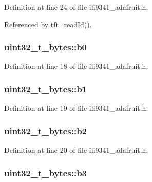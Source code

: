 Definition at line 24 of file ili9341\-\_\-adafruit.\-h.



Referenced by tft\-\_\-read\-Id().

\hypertarget{unionuint32__t__bytes_a92b86537decb69327191d870f41c60f7}{
\subsubsection[{b0}]{ uint32\-\_\-t\-\_\-bytes\-::b0}}\label{unionuint32__t__bytes_a92b86537decb69327191d870f41c60f7}


Definition at line 18 of file ili9341\-\_\-adafruit.\-h.

\hypertarget{unionuint32__t__bytes_a91fb31482a2ce44b454fca964dcd556b}{
\subsubsection[{b1}]{ uint32\-\_\-t\-\_\-bytes\-::b1}}\label{unionuint32__t__bytes_a91fb31482a2ce44b454fca964dcd556b}


Definition at line 19 of file ili9341\-\_\-adafruit.\-h.

\hypertarget{unionuint32__t__bytes_a462312b99de0c6d1c497064902196e1d}{
\subsubsection[{b2}]{ uint32\-\_\-t\-\_\-bytes\-::b2}}\label{unionuint32__t__bytes_a462312b99de0c6d1c497064902196e1d}


Definition at line 20 of file ili9341\-\_\-adafruit.\-h.

\hypertarget{unionuint32__t__bytes_abd7739cae59fab7cf712d53f337b378a}{
\subsubsection[{b3}]{ uint32\-\_\-t\-\_\-bytes\-::b3}}\label{unionuint32__t__bytes_abd7739cae59fab7cf712d53f337b378a}


